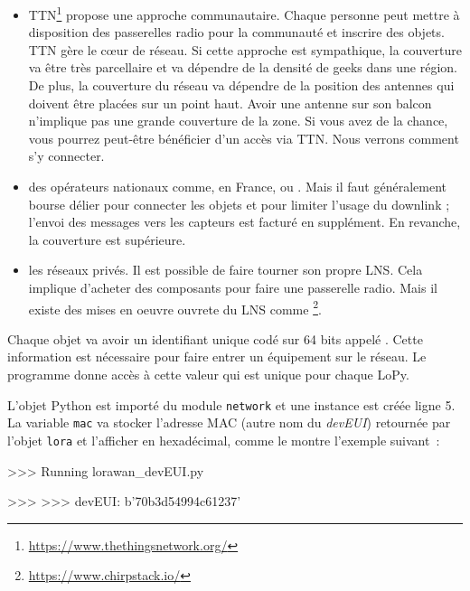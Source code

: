 \begin{itemize}
    \item  \ac{TTN}\footnote{\url{https://www.thethingsnetwork.org/}} propose une approche communautaire. Chaque personne peut mettre à disposition des passerelles radio pour la communauté et inscrire des objets. TTN gère le cœur de réseau. Si cette approche est sympathique, la couverture va être très parcellaire et va dépendre de la densité de geeks dans une région. De plus, la couverture du réseau va dépendre de la position des antennes qui doivent être placées sur un point haut. Avoir une antenne sur son balcon n’implique pas une grande couverture de la zone. Si vous avez de la chance, vous pourrez peut-être bénéficier d’un accès via TTN. Nous verrons comment s’y connecter.
    \item des opérateurs nationaux comme, en France,  ou . Mais il faut généralement bourse délier pour connecter les objets et pour limiter l’usage du downlink ; l’envoi des messages vers les capteurs est facturé en supplément. En revanche, la couverture est supérieure.
    \item les réseaux privés. Il est possible de faire tourner son propre LNS. Cela implique d’acheter des composants pour faire une passerelle radio. Mais il existe des mises en oeuvre ouvrete du LNS comme \footnote{\url{https://www.chirpstack.io/}}. 

\end{itemize}


Chaque objet va avoir un identifiant unique codé sur 64 bits appelé \textit{}. Cette information est nécessaire pour faire entrer un équipement sur le réseau. Le programme  donne accès à cette valeur qui est unique pour chaque LoPy.

\label{prog-devEUI}

L’objet Python  est importé du module \texttt{network} et une instance est créée ligne 5. La variable \texttt{mac} va stocker l’adresse MAC (autre nom du \textit{devEUI}) retournée par l’objet \texttt{lora} et l'afficher en hexadécimal, comme le montre l’exemple suivant~:

\begin{termc}[backgroundcolor=\color{gray!10}, basicstyle=\ttfamily\small, escapechar=@] 
>>> Running lorawan_devEUI.py

>>>
>>>
devEUI:  b'70b3d54994c61237'
\end{termc}

